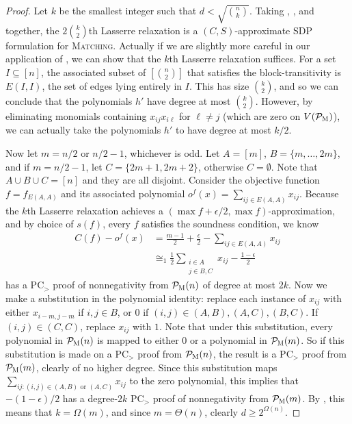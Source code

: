 \begin{proof}
Let $k$ be the smallest integer such that $d < \sqrt{\binom{n}{k}}$. Taking , , and  together, the $2\binom{k}{2}$th Lasserre relaxation is a $(C,S)$-approximate SDP formulation for \textsc{Matching}. Actually if we are slightly more careful in our application of , we can show that the $k$th Lasserre relaxation suffices. For a set $I \subseteq [n]$, the associated subset of $\left[\binom{n}{2}\right]$ that satisfies the block-transitivity is $E(I,I)$, the set of edges lying entirely in $I$. This has size $\binom{k}{2}$, and so we can conclude that the polynomials $h'$ have degree at most $\binom{k}{2}$. However, by eliminating monomials containing $x_{ij}x_{i\ell}$ for $\ell \neq j$ (which are zero on $V(\mathcal P_{\textsc{M}})$), we can actually take the polynomials $h'$ to have degree at most $k/2$. 

Now let $m = n/2$ or $n/2-1$, whichever is odd. Let $A = [m]$, $B = \{m,\dots, 2m\}$, and if $m = n/2-1$, let $C = \{2m+1,2m+2\}$, otherwise $C = \emptyset$. Note that $A \cup B \cup C = [n]$ and they are all disjoint. Consider the objective function $f = f_{E(A,A)}$ and its associated polynomial $o^f(x) = \sum_{ij \in E(A,A)} x_{ij}$. Because the $k$th Lasserre relaxation achieves a $(\max f + \epsilon/2,\max f)$-approximation, and by choice of $s(f)$, every $f$ satisfies the soundness condition, we know
\begin{align*}
C(f) - o^f(x) &= \frac{m-1}{2} + \frac{\epsilon}{2} - \sum_{ij \in E(A,A)} x_{ij} \\
&\cong_1 \frac{1}{2}\sum_{\substack{i \in A \\ j \in B,C}} x_{ij} - \frac{1-\epsilon}{2}
\end{align*}
has a PC$_>$ proof of nonnegativity from $\mathcal P_{\textsc{M}}(n)$ of degree at most $2k$. Now we make a substitution in the polynomial identity: replace each instance of $x_{ij}$ with either $x_{i-m, j-m}$ if $i,j \in B$, or $0$ if $(i,j) \in (A,B), (A,C), (B,C)$. If $(i,j) \in (C,C)$, replace $x_{ij}$ with $1$. Note that under this substitution, every polynomial in $\mathcal P_{\textsc{M}}(n)$ is mapped to either $0$ or a polynomial in $\mathcal P_{\textsc{M}}(m)$. So if this substitution is made on a PC$_>$ proof from $\mathcal P_{\textsc{M}}(n)$, the result is a PC$_>$ proof from $\mathcal P_{\textsc{M}}(m)$, clearly of no higher degree. Since this substitution maps $\sum_{ij: (i,j) \in (A,B) \text{ or } (A,C)} x_{ij}$ to the zero polynomial, this implies that $-(1-\epsilon)/2$ has a degree-$2k$ PC$_>$ proof of nonnegativity from $\mathcal P_{\textsc{M}}(m)$. By , this means that $k = \Omega(m)$, and since $m = \Theta(n)$, clearly $d \geq 2^{\Omega(n)}$.
\end{proof}
